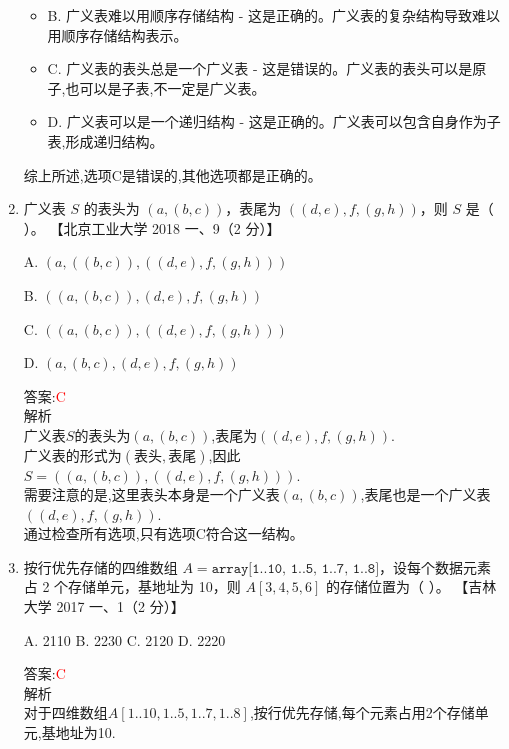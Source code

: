 \documentclass[lang=cn,newtx,10pt,scheme=chinese]{../elegantbook}
\begin{document}
\begin{enumerate}
\begin{itemize}
        \item B. 广义表难以用顺序存储结构 - 这是正确的。广义表的复杂结构导致难以用顺序存储结构表示。
        
        \item C. 广义表的表头总是一个广义表 - 这是错误的。广义表的表头可以是原子,也可以是子表,不一定是广义表。
        
        \item D. 广义表可以是一个递归结构 - 这是正确的。广义表可以包含自身作为子表,形成递归结构。
    \end{itemize}
    
    综上所述,选项C是错误的,其他选项都是正确的。\\

    \item 广义表 $S$ 的表头为 $(a, (b, c))$，表尾为 $((d, e), f,(g, h))$，则 $S$ 是（ ）。  
    【北京工业大学 2018 一、9（2 分）】  

    A. $(a, ((b, c)), ((d, e),f, (g, h)))$  

    B. $((a, (b, c)), (d, e), f, (g, h))$  

    C. $((a, (b, c)), ((d, e), f, (g, h)))$  

    D. $(a, (b, c), (d, e), f, (g, h))$  
    
    答案:\textcolor{red}{C}\\
    解析\\
    广义表$S$的表头为$(a, (b, c))$,表尾为$((d, e), f,(g, h))$.\\
    
    广义表的形式为$(表头, 表尾)$,因此$S = ((a, (b, c)), ((d, e), f,(g, h)))$.\\
    
    需要注意的是,这里表头本身是一个广义表$(a, (b, c))$,表尾也是一个广义表$((d, e), f,(g, h))$.\\
    
    通过检查所有选项,只有选项C符合这一结构。\\

    \item 按行优先存储的四维数组 $A = \texttt{array[1..10, 1..5, 1..7, 1..8]}$，设每个数据元素占 2 个存储单元，基地址为 10，则 $A[3, 4, 5, 6]$ 的存储位置为（ ）。  
    【吉林大学 2017 一、1（2 分）】  

    A. 2110 \quad B. 2230 \quad C. 2120 \quad D. 2220 
    
    答案:\textcolor{red}{C}\\
    解析\\
    对于四维数组$A[1..10, 1..5, 1..7, 1..8]$,按行优先存储,每个元素占用2个存储单元,基地址为10.\\
    

\end{enumerate}
\end{document}
